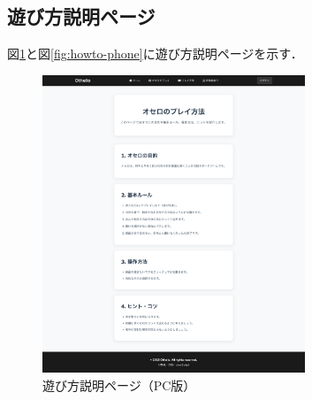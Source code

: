 \documentclass[10pt, a4paper]{jsarticle}
\begin{document}
\subsection{遊び方説明ページ}
図\ref{fig:howto-pc}と図\ref{fig:howto-phone}に遊び方説明ページを示す．

\begin{figure}[H]
\centering
\includegraphics[width=0.7\textwidth]{img/howto-pc.png}
\caption{遊び方説明ページ（PC版）}
\label{fig:howto-pc}
\end{figure}
\end{document}
